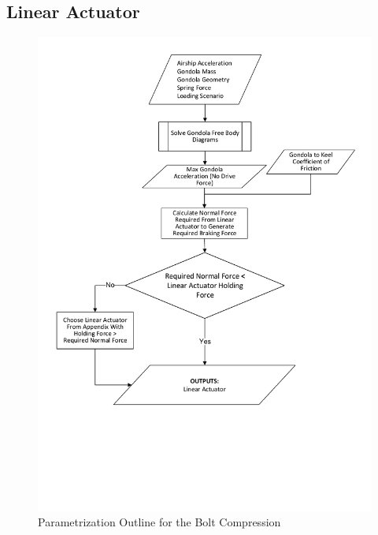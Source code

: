 \documentclass[../main.tex]{subfiles}
\begin{document}
\subsection{Linear Actuator} \label{linearActuator}

\begin{figure}[H]
	\centering
	\includegraphics[width=\linewidth]{img/paramaterization/linearActuator.pdf}
	\caption{Parametrization Outline for the Bolt Compression}
	\label{fig:linearActuatorParametrization}
\end{figure}
\end{document}
